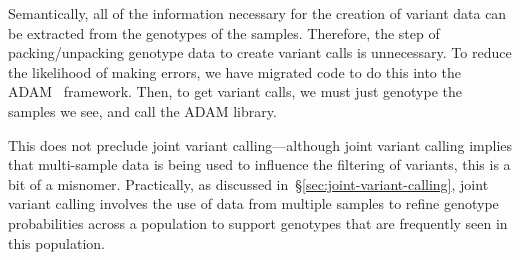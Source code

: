 \documentclass{acm_proc_article-sp}
\begin{document}
Semantically, all of the information necessary for the creation of variant data can be extracted from the genotypes of the samples.
Therefore, the step of packing/unpacking genotype data to create variant calls is unnecessary. To reduce the likelihood of making
errors, we have migrated code to do this into the ADAM~\cite{massie13} framework. Then, to get variant calls, we must just genotype
the samples we see, and call the ADAM library.

This does not preclude joint variant calling---although joint variant calling implies that multi-sample data is being used to influence
the filtering of variants, this is a bit of a misnomer. Practically, as discussed in~\S\ref{sec:joint-variant-calling}, joint variant calling
involves the use of data from multiple samples to refine genotype probabilities across a population to support genotypes that are
frequently seen in this population.

%

  

\balancecolumns
\end{document}
